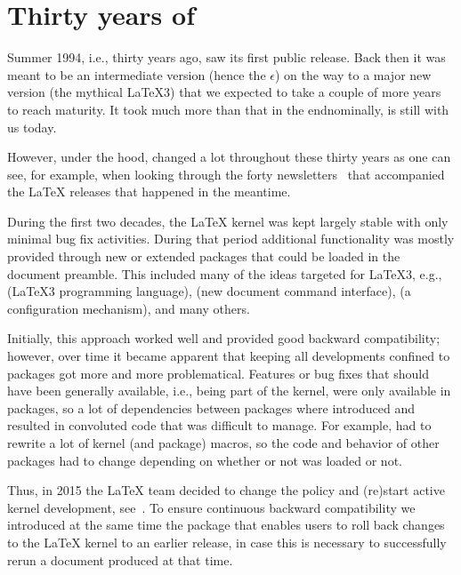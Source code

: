 \documentclass{ltnews}
\providecommand\Dash {\unskip \textemdash}
\begin{document}
\maketitle
{  \spaceskip=3.33pt 
\tableofcontents}

\setlength{}

\medskip


\section{Thirty years of \LaTeXe{}}

Summer 1994, i.e., thirty years ago, \LaTeXe{} saw its first public
release. Back then it was meant to be an intermediate version (hence
the $\epsilon$) on the way to a major new version (the mythical
\LaTeX3) that we expected to take a couple of more years to reach
maturity. It took much more than that in the end\Dash nominally,
\LaTeXe{} is still with us today.

However, under the hood, \LaTeXe{} changed a lot throughout these
thirty years as one can see, for example, when looking through the
forty newsletters~\cite{40:ltnews} that accompanied the \LaTeX{}
releases that happened in the meantime.

During the first two decades, the \LaTeX{} kernel was kept largely
stable with only minimal bug fix activities. During that period
additional functionality was mostly provided through new or
extended packages that could be loaded in the document preamble. This
included many of the ideas targeted for \LaTeX3{}, e.g., 
(\LaTeX3 programming language),  (new document command
interface),  (a configuration mechanism), and many
others.

Initially, this approach worked well and provided good backward
compatibility; however, over time it became apparent that keeping all
developments confined to packages got more and more problematical.
Features or bug fixes that should have been generally available, i.e.,
being part of the kernel, were only available in packages, so a lot of
dependencies between packages where introduced and resulted in
convoluted code that was difficult to manage. For example,
 had to rewrite a lot of kernel (and package) macros, so
the code and behavior of other packages had to change depending on
whether or not  was loaded or not.

Thus, in 2015 the \LaTeX{} team decided to change the policy and
(re)start active kernel development, see~\cite{40:ltnews22}. To ensure
continuous backward compatibility we introduced at the same time the
 package that enables users to roll back changes to
the \LaTeX{} kernel to an earlier release, in case this is necessary
to successfully rerun a document produced at that time.
\end{document}
